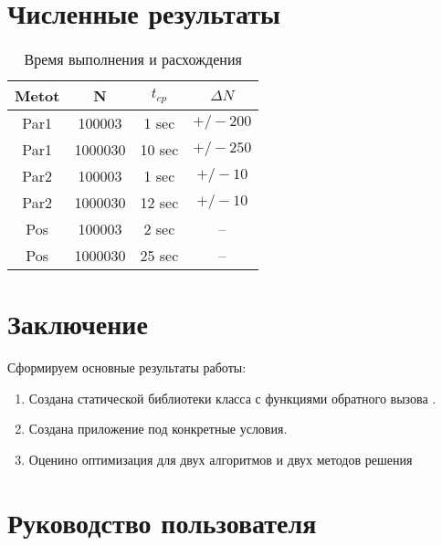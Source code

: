 \section{Численные результаты}
\begin{table}[hp]
\begin{tabular}{|c|c|c|c|}
\hline 
Metot & N & $t_{cp}$ & $\Delta N$ \\ \hline
Par1 & 100003 & 1 sec & $+/- 200 $ \\ \hline
Par1 & 1000030 & 10 sec & $+/- 250 $ \\ \hline
Par2 & 100003 & 1 sec & $+/- 10 $ \\ \hline
Par2 & 1000030 & 12 sec & $+/- 10 $ \\ \hline
Pos & 100003 & 2 sec & -- \\ \hline
Pos & 1000030 & 25 sec & -- \\ \hline
\end{tabular}
\caption{Время выполнения и расхождения}
\end{table}

\section{Заключение}
 Сформируем основные результаты работы:
 \begin{enumerate}
	\item Создана статической библиотеки класса с функциями обратного вызова .
	\item Создана приложение под конкретные условия.
	\item Оценино оптимизация для двух алгоритмов и двух методов решения
\end{enumerate}
\section{Руководство пользователя}
